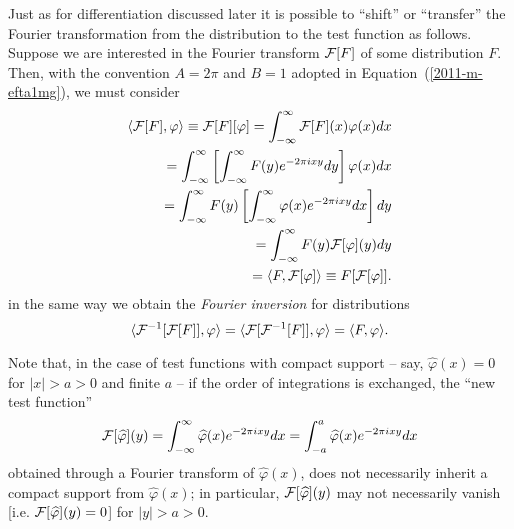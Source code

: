 Just as for differentiation discussed later it is possible to ``shift'' or ``transfer'' the
Fourier transformation from the distribution to the test function
as follows.
Suppose we are interested in the Fourier transform ${\cal F}[F]$ of some distribution $F$.
Then, with the convention
 $A=2\pi $ and $B=1$  adopted in Equation~(\ref{2011-m-efta1mg}), we must consider
\begin{equation}
\begin{split}
\langle  {\cal F}[F ], \varphi \rangle \equiv {\cal F}[F ][\varphi ]
=
\int_{-\infty}^\infty {\cal F}[F](x) \varphi (x) dx
\\ \qquad =
\int_{-\infty}^\infty \left[ \int_{-\infty}^\infty F(y) e^{- 2\pi ixy} dy \right] \varphi (x) dx
\\ \qquad =
\int_{-\infty}^\infty  F(y)  \left[ \int_{-\infty}^\infty \varphi (x) e^{- 2\pi ixy}  dx \right] dy
\\ \qquad =
\int_{-\infty}^\infty  F(y)  {\cal F}[ \varphi ](y) dy
\\ \qquad =
\langle  F , {\cal F}[\varphi ]\rangle \equiv F [{\cal F}[\varphi ]]
.
\end{split}
\label{2019-mm-ft-1}
\end{equation}
in the same way we obtain the
{\em Fourier inversion}
for distributions
\begin{equation}
\langle   {\cal F}^{-1}[{\cal F}[F ]], \varphi \rangle
=
\langle   {\cal F}[{\cal F}^{-1}[F ]], \varphi \rangle
=
\langle    F  , \varphi \rangle
.
\end{equation}

Note that, in the case of test functions with compact support -- say, $\widehat{\varphi} (x) = 0$ for $\vert x \vert > a > 0$ and finite $a$
--  if the order of integrations is exchanged, the ``new test function''
\begin{equation}
{\cal F}[ \widehat{\varphi}] (y)=
\int_{-\infty}^\infty  \widehat{\varphi} (x) e^{- 2\pi ixy}  dx
=
\int_{-a}^a  \widehat{\varphi} (x) e^{- 2\pi ixy}  dx
\label{2019-mm-ft-2}
\end{equation}
obtained through a Fourier transform of  $\widehat{\varphi} (x)$,
does not necessarily inherit a compact support  from $\widehat{\varphi} (x)$;
in particular,
${\cal F}[ \widehat{\varphi}] (y)$
may not necessarily vanish [i.e.  ${\cal F}[ \widehat{\varphi}] (y) = 0$] for $\vert y \vert > a > 0$.


